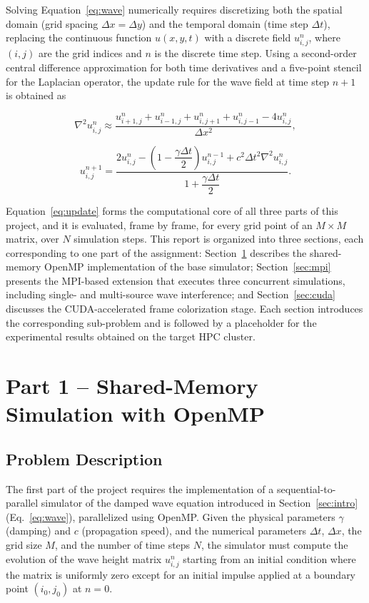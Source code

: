 \documentclass[10pt,twocolumn]{article}
\begin{document}
Solving Equation~\eqref{eq:wave} numerically requires discretizing both the spatial domain
(grid spacing $\Delta x = \Delta y$) and the temporal domain (time step $\Delta t$), replacing
the continuous function $u(x,y,t)$ with a discrete field $u_{i,j}^{n}$, where $(i,j)$ are the
grid indices and $n$ is the discrete time step. Using a second-order central difference
approximation for both time derivatives and a five-point stencil for the Laplacian operator,
the update rule for the wave field at time step $n+1$ is obtained as

\begin{equation}
\nabla^2 u_{i,j}^{n} \approx
\frac{u_{i+1,j}^{n} + u_{i-1,j}^{n} + u_{i,j+1}^{n} + u_{i,j-1}^{n} - 4u_{i,j}^{n}}{\Delta x^2},
\label{eq:laplacian}
\end{equation}

\begin{equation}
u_{i,j}^{n+1} =
\frac{2u_{i,j}^{n} - \left(1 - \dfrac{\gamma \Delta t}{2}\right)u_{i,j}^{n-1}
+ c^2 \Delta t^2 \nabla^2 u_{i,j}^{n}}
{1 + \dfrac{\gamma \Delta t}{2}}.
\label{eq:update}
\end{equation}

Equation~\eqref{eq:update} forms the computational core of all three parts of this project,
and it is evaluated, frame by frame, for every grid point of an $M \times M$ matrix, over $N$
simulation steps. This report is organized into three sections, each corresponding to one part
of the assignment: Section~\ref{sec:openmp} describes the shared-memory OpenMP implementation
of the base simulator; Section~\ref{sec:mpi} presents the MPI-based extension that executes
three concurrent simulations, including single- and multi-source wave interference; and
Section~\ref{sec:cuda} discusses the CUDA-accelerated frame colorization stage. Each section
introduces the corresponding sub-problem and is followed by a placeholder for the experimental
results obtained on the target HPC cluster.

\section{Part 1 -- Shared-Memory Simulation with OpenMP}
\label{sec:openmp}

\subsection{Problem Description}
The first part of the project requires the implementation of a sequential-to-parallel
simulator of the damped wave equation introduced in Section~\ref{sec:intro} (Eq.~\ref{eq:wave}),
parallelized using OpenMP. Given the physical parameters $\gamma$ (damping) and $c$
(propagation speed), and the numerical parameters $\Delta t$, $\Delta x$, the grid size $M$,
and the number of time steps $N$, the simulator must compute the evolution of the wave height
matrix $u_{i,j}^{n}$ starting from an initial condition where the matrix is uniformly zero
except for an initial impulse applied at a boundary point $(i_0, j_0)$ at $n=0$.
\end{document}
